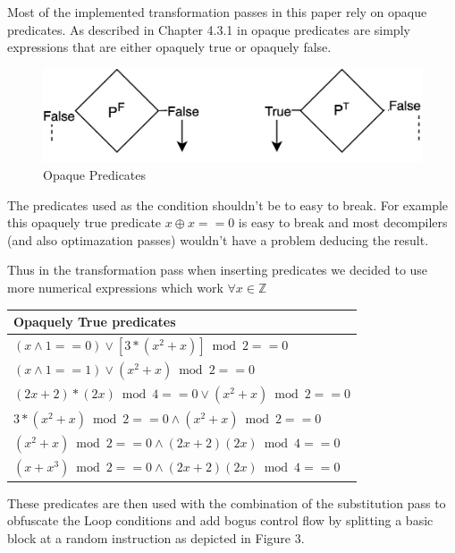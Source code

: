 Most of the implemented transformation passes in this paper rely on opaque predicates. As described in Chapter 4.3.1 in \cite{ss-chpt4}
opaque predicates are simply expressions that are either opaquely true or opaquely false.

\begin{figure}
  \includegraphics[width=1\textwidth]{./images/predicates.jpeg}
  \caption{Opaque Predicates}
\end{figure}

The predicates used as the condition shouldn't be to easy to break. For example this opaquely true predicate $x\oplus x ==0$ is easy to break
and most decompilers (and also optimazation passes) wouldn't have a problem deducing the result.

Thus in the transformation pass when inserting predicates we decided to use more numerical expressions which
work $\forall x \in \mathbb{Z}$

\begin{center}
\begin{tabular}{|l|}
  \hline
  Opaquely True predicates \\
  \hline
  $(x \land 1 == 0) \lor [3 * (x^{2} + x)] \bmod 2 == 0$\\
  \hline
  $(x \land 1 == 1) \lor (x^{2} + x) \bmod 2 == 0$ \\
  \hline
  $(2x + 2)*(2x) \bmod 4 == 0 \lor (x^{2} + x) \bmod 2 == 0$ \\
  \hline
  $3*(x^{2} + x) \bmod 2 == 0 \land (x^{2} + x) \bmod 2 == 0$ \\
  \hline
  $(x^{2} + x) \bmod 2 == 0 \land (2x+2)(2x) \bmod 4 == 0$ \\
  \hline
  $(x + x^{3}) \bmod 2 == 0 \land (2x + 2)(2x) \bmod 4 == 0$ \\
  \hline
\end{tabular}
\end{center}

These predicates are then used with the combination of the substitution pass to obfuscate the Loop conditions and add
bogus control flow by splitting a basic block at a random instruction as depicted in Figure 3.

